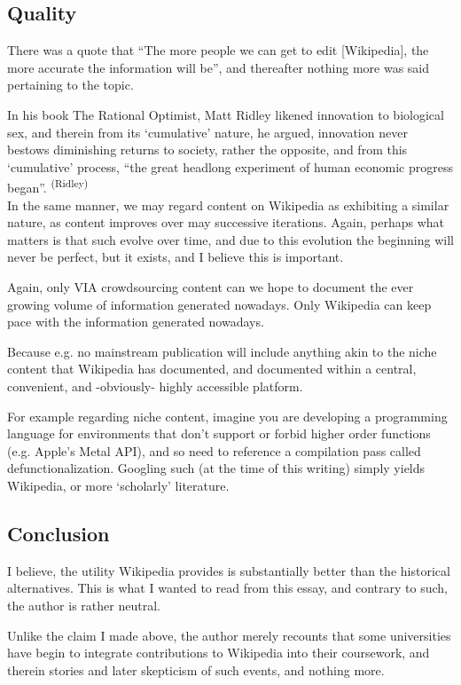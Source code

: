 \subsection{Quality}

There was a quote that ``The more people we can get to edit [Wikipedia], the more accurate the information will be'', and thereafter nothing more was said pertaining to the topic.

In his book The Rational Optimist, Matt Ridley likened innovation to biological sex, and therein from its `cumulative' nature, he argued, innovation never bestows diminishing returns to society, rather the opposite, and from this `cumulative' process, ``the great headlong experiment of human economic progress began''. \textsuperscript{(Ridley)}\\[1in]

In the same manner, we may regard content on Wikipedia as exhibiting a similar nature, as content improves over may successive iterations. Again, perhaps what matters is that such evolve over time, and due to this evolution the beginning will never be perfect, but it exists, and I believe this is important.

Again, only VIA crowdsourcing content can we hope to document the ever growing volume of information generated nowadays. Only Wikipedia can keep pace with the information generated nowadays.

Because e.g. no mainstream publication will include anything akin to the niche content that Wikipedia has documented, and documented within a central, convenient, and -obviously- highly accessible platform.

For example regarding niche content, imagine you are developing a programming language for environments that don’t support or forbid higher order functions (e.g. Apple’s Metal API), and so need to reference a compilation pass called defunctionalization. Googling such (at the time of this writing) simply yields Wikipedia, or more ‘scholarly’ literature.

\subsection{Conclusion}

I believe, the utility Wikipedia provides is substantially better than the historical alternatives. This is what I wanted to read from this essay, and contrary to such, the author is rather neutral.

Unlike the claim I made above, the author merely recounts that some universities have begin to integrate contributions to Wikipedia into their coursework, and therein stories and later skepticism of such events, and nothing more.

